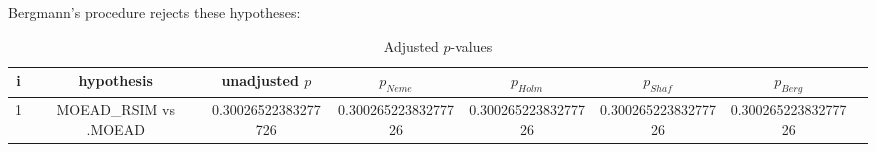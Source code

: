 \documentclass[a4paper,10pt]{article}
\begin{document}
\begin{landscape}
Bergmann's procedure rejects these hypotheses:


\begin{itemize}


\end{itemize}


\begin{table}[!htp]
\centering\tiny
\caption{Adjusted $p$-values}
\begin{tabular}{cccccccc}
i&hypothesis&unadjusted $p$&$p_{Neme}$&$p_{Holm}$&$p_{Shaf}$&$p_{Berg}$\\
\hline
1&MOEAD_RSIM vs .MOEAD&0.30026522383277726&0.30026522383277726&0.30026522383277726&0.30026522383277726&0.30026522383277726\\
\hline
\end{tabular}
\end{table}

\end{landscape}
\end{document}
